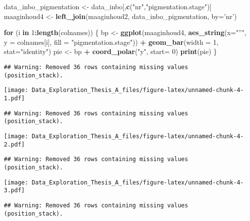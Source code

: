 \documentclass[]{article}
\newenvironment{Shaded}{\begin{snugshade}}{\end{snugshade}}
\newcommand{\KeywordTok}[1]{\textcolor[rgb]{0.13,0.29,0.53}{\textbf{#1}}}
\newcommand{\DataTypeTok}[1]{\textcolor[rgb]{0.13,0.29,0.53}{#1}}
\newcommand{\DecValTok}[1]{\textcolor[rgb]{0.00,0.00,0.81}{#1}}
\newcommand{\StringTok}[1]{\textcolor[rgb]{0.31,0.60,0.02}{#1}}
\newcommand{\ControlFlowTok}[1]{\textcolor[rgb]{0.13,0.29,0.53}{\textbf{#1}}}
\newcommand{\OperatorTok}[1]{\textcolor[rgb]{0.81,0.36,0.00}{\textbf{#1}}}
\newcommand{\NormalTok}[1]{#1}
\begin{document}
\begin{Shaded}
\begin{Highlighting}[]
\NormalTok{data_inbo_pigmentation <-}\StringTok{ }\NormalTok{data_inbo[,}\KeywordTok{c}\NormalTok{(}\StringTok{"nr"}\NormalTok{,}\StringTok{"pigmentation.stage"}\NormalTok{)]}
\NormalTok{maaginhoud4 <-}\StringTok{ }\KeywordTok{left_join}\NormalTok{(maaginhoud2, data_inbo_pigmentation, }\DataTypeTok{by=}\StringTok{'nr'}\NormalTok{)}

\ControlFlowTok{for}\NormalTok{ (i }\ControlFlowTok{in} \DecValTok{1}\OperatorTok{:}\KeywordTok{length}\NormalTok{(colnames)) \{}
\NormalTok{  bp <-}\StringTok{ }\KeywordTok{ggplot}\NormalTok{(maaginhoud4, }\KeywordTok{aes_string}\NormalTok{(}\DataTypeTok{x=}\StringTok{"''"}\NormalTok{, }\DataTypeTok{y =}\NormalTok{ colnames[i], }\DataTypeTok{fill =} \StringTok{"pigmentation.stage"}\NormalTok{)) }\OperatorTok{+}
\StringTok{    }\KeywordTok{geom_bar}\NormalTok{(}\DataTypeTok{width =} \DecValTok{1}\NormalTok{, }\DataTypeTok{stat=}\StringTok{"identity"}\NormalTok{)}
\NormalTok{  pie <-}\StringTok{ }\NormalTok{bp }\OperatorTok{+}\StringTok{ }\KeywordTok{coord_polar}\NormalTok{(}\StringTok{"y"}\NormalTok{, }\DataTypeTok{start=} \DecValTok{0}\NormalTok{)}
  \KeywordTok{print}\NormalTok{(pie)}
\NormalTok{\}}
\end{Highlighting}
\end{Shaded}

\begin{verbatim}
## Warning: Removed 36 rows containing missing values (position_stack).
\end{verbatim}

\texttt{[image: Data\_Exploration\_Thesis\_A\_files/figure-latex/unnamed-chunk-4-1.pdf]}

\begin{verbatim}
## Warning: Removed 36 rows containing missing values (position_stack).
\end{verbatim}

\texttt{[image: Data\_Exploration\_Thesis\_A\_files/figure-latex/unnamed-chunk-4-2.pdf]}

\begin{verbatim}
## Warning: Removed 36 rows containing missing values (position_stack).
\end{verbatim}

\texttt{[image: Data\_Exploration\_Thesis\_A\_files/figure-latex/unnamed-chunk-4-3.pdf]}

\begin{verbatim}
## Warning: Removed 36 rows containing missing values (position_stack).
\end{verbatim}
\end{document}
